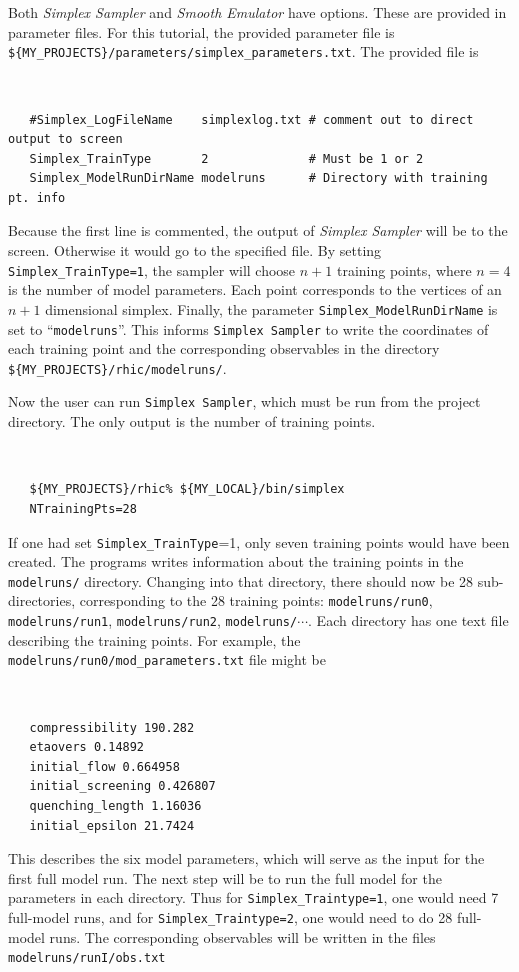 \documentclass[UserManual.tex]{subfiles}
\begin{document}
Both {\it Simplex Sampler} and {\it Smooth Emulator} have options. These are provided in parameter files. For this tutorial, the provided parameter file is {\tt \$\{MY\_PROJECTS\}/parameters/simplex\_parameters.txt}. The provided file is
{\tt
\begin{verbatim}
   #Simplex_LogFileName    simplexlog.txt # comment out to direct output to screen
   Simplex_TrainType       2              # Must be 1 or 2             
   Simplex_ModelRunDirName modelruns      # Directory with training pt. info
\end{verbatim}
}
Because the first line is commented, the output of {\it Simplex Sampler} will be to the screen. Otherwise it would go to the specified file. By setting {\tt Simplex\_TrainType=1}, the sampler will choose $n+1$ training points, where $n=4$ is the number of model parameters. Each point corresponds to the vertices of an $n+1$ dimensional simplex.  Finally, the parameter {\tt Simplex\_ModelRunDirName} is set to ``{\tt modelruns}''. This informs {\tt Simplex Sampler} to write the coordinates of each training point and the corresponding observables in the directory {\tt \$\{MY\_PROJECTS\}/rhic/modelruns/}. 

Now the user can run {\tt Simplex Sampler}, which must be run from the project directory. The only output is the number of training points.
 {\tt
\begin{verbatim}
   ${MY_PROJECTS}/rhic% ${MY_LOCAL}/bin/simplex
   NTrainingPts=28
\end{verbatim}
}
If one had set {\tt Simplex\_TrainType}=1, only seven training points would have been created. The programs writes information about the training points in the {\tt modelruns/} directory. Changing into that directory, there should now be 28 sub-directories, corresponding to the 28 training points: {\tt modelruns/run0}, {\tt modelruns/run1}, {\tt modelruns/run2}, {\tt modelruns/}$\cdots$. Each directory has one text file describing the training points. For example, the {\tt modelruns/run0/mod\_parameters.txt} file might be 
{\tt
\begin{verbatim}
   compressibility 190.282
   etaovers 0.14892
   initial_flow 0.664958
   initial_screening 0.426807
   quenching_length 1.16036
   initial_epsilon 21.7424
\end{verbatim}
}
This describes the six model parameters, which will serve as the input for the first full model run.  The next step will be to run the full model for the parameters in each directory. Thus for {\tt Simplex\_Traintype=1}, one would need 7 full-model runs, and for {\tt Simplex\_Traintype=2}, one would need to do 28 full-model runs. The corresponding observables will be written in the files {\tt modelruns/runI/obs.txt}
\end{document}
